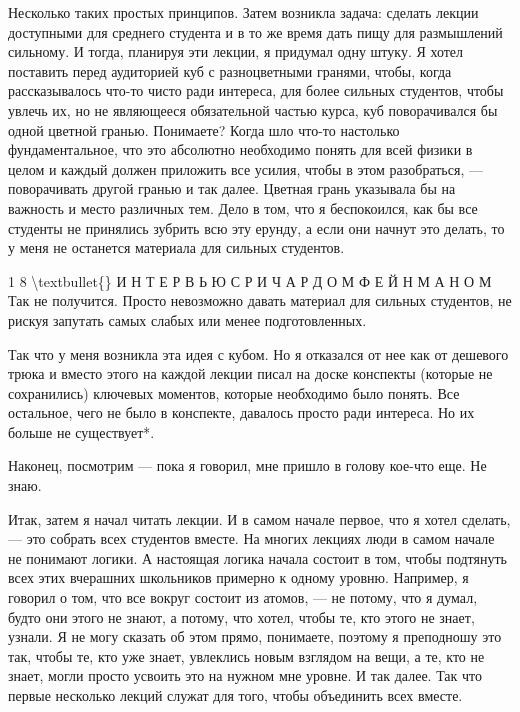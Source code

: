 \documentclass[10pt,oneside]{article}
\begin{document}
Несколько таких простых принципов. Затем возникла задача: сделать лекции доступными для среднего студента и в то же время дать пищу для размышлений сильному. И тогда, планируя эти лекции, я придумал одну штуку. Я хотел поставить перед аудиторией куб с разноцветными гранями, чтобы, когда рассказывалось что-то чисто ради интереса, для более сильных студентов, чтобы увлечь их, но не являющееся обязательной частью курса, куб поворачивался бы одной цветной гранью. Понимаете? Когда шло что-то настолько фундаментальное, что это абсолютно необходимо понять для всей физики в целом и каждый должен приложить все усилия, чтобы в этом разобраться, --- поворачивать другой гранью и так далее. Цветная грань указывала бы на важность и место различных тем. Дело в том, что я беспокоился, как бы все студенты не принялись зубрить всю эту ерунду, а если они начнут это делать, то у меня не останется материала для сильных студентов.\par

1 8 \textbackslash{}textbullet\{\} И Н Т Е Р В Ь Ю  С  Р И Ч А Р Д О М  Ф Е Й Н М А Н О М Так не получится. Просто невозможно давать материал для сильных студентов, не рискуя запутать самых слабых или менее подготовленных.\par

Так что у меня возникла эта идея с кубом. Но я отказался от нее как от дешевого трюка и вместо этого на каждой лекции писал на доске конспекты (которые не сохранились) ключевых моментов, которые необходимо было понять. Все остальное, чего не было в конспекте, давалось просто ради интереса. Но их больше не существует*.\par

Наконец, посмотрим --- пока я говорил, мне пришло в голову кое-что еще. Не знаю.\par

Итак, затем я начал читать лекции. И в самом начале первое, что я хотел сделать, --- это собрать всех студентов вместе. На многих лекциях люди в самом начале не понимают логики. А настоящая логика начала состоит в том, чтобы подтянуть всех этих вчерашних школьников примерно к одному уровню. Например, я говорил о том, что все вокруг состоит из атомов, --- не потому, что я думал, будто они этого не знают, а потому, что хотел, чтобы те, кто этого не знает, узнали. Я не могу сказать об этом прямо, понимаете, поэтому я преподношу это так, чтобы те, кто уже знает, увлеклись новым взглядом на вещи, а те, кто не знает, могли просто усвоить это на нужном мне уровне. И так далее. Так что первые несколько лекций служат для того, чтобы объединить всех вместе.\par
\end{document}
